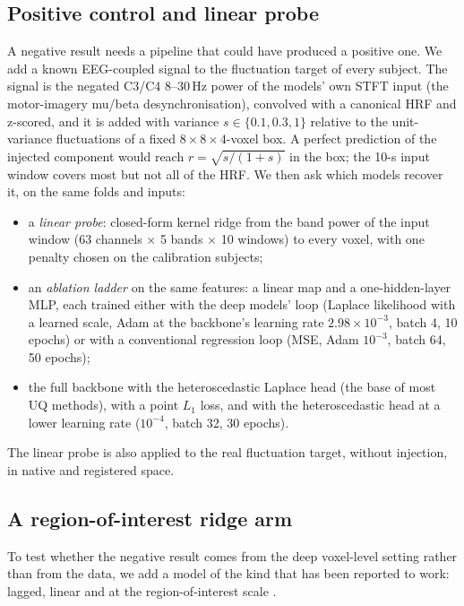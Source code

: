 \subsection{Positive control and linear probe}\label{sec:positive}
A negative result needs a pipeline that could have produced a positive one. We add a known EEG-coupled signal to the fluctuation target of every subject. The signal is the negated C3/C4 8--30\,Hz power of the models' own STFT input (the motor-imagery mu/beta desynchronisation), convolved with a canonical HRF and z-scored, and it is added with variance $s\in\{0.1, 0.3, 1\}$ relative to the unit-variance fluctuations of a fixed $8\times8\times4$-voxel box. A perfect prediction of the injected component would reach $r=\sqrt{s/(1+s)}$ in the box; the 10-s input window covers most but not all of the HRF. We then ask which models recover it, on the same folds and inputs:
\begin{itemize}
	\item a \emph{linear probe}: closed-form kernel ridge from the band power of the input window (63 channels $\times$ 5 bands $\times$ 10 windows) to every voxel, with one penalty chosen on the calibration subjects;
	\item an \emph{ablation ladder} on the same features: a linear map and a one-hidden-layer MLP, each trained either with the deep models' loop (Laplace likelihood with a learned scale, Adam at the backbone's learning rate $2.98\times10^{-3}$, batch 4, 10 epochs) or with a conventional regression loop (MSE, Adam $10^{-3}$, batch 64, 50 epochs);
	\item the full backbone with the heteroscedastic Laplace head (the base of most UQ methods), with a point $L_1$ loss, and with the heteroscedastic head at a lower learning rate ($10^{-4}$, batch 32, 30 epochs).
\end{itemize}
The linear probe is also applied to the real fluctuation target, without injection, in native and registered space.


\subsection{A region-of-interest ridge arm}\label{sec:ridge}
To test whether the negative result comes from the deep voxel-level setting rather than from the data, we add a model of the kind that has been reported to work: lagged, linear and at the region-of-interest scale \citep{mehta2025eegbold}.

